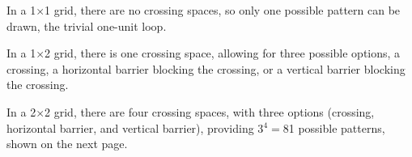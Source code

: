 
In a 1$\times$1 grid, there are no crossing spaces, so only one possible pattern can be drawn, the trivial one-unit loop.
\begin{center}

\end{center}

\noindent
In a 1$\times$2 grid, there is one crossing space, allowing for three possible options, a crossing, a horizontal barrier blocking the crossing, or a vertical barrier blocking the crossing.
\begin{center}

\hspace{0.5cm}
\hspace{0.5cm}

\end{center}

\noindent
In a 2$\times$2 grid, there are four crossing spaces, with three options (crossing, horizontal barrier, and vertical barrier), providing 3$^4=$81 possible patterns, shown on the next page.

\newpage


\noindent
\scalebox{0.6}{
\begin{minipage}{18cm}

\end{minipage}
}
